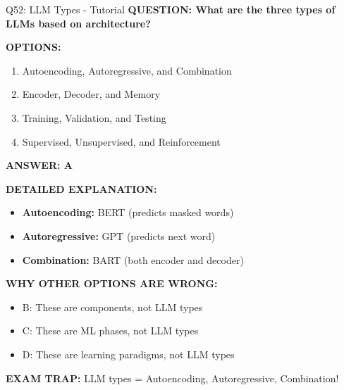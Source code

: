 \documentclass[8pt]{beamer}
\begin{document}
	\begin{frame}{Q52: LLM Types - Tutorial}
		\fontsize{6.5}{7.5}\selectfont
		\textbf{QUESTION: What are the three types of LLMs based on architecture?}
		
		\vspace{0.1cm}
		\textbf{OPTIONS:}
		\begin{enumerate}
			\item Autoencoding, Autoregressive, and Combination
			\item Encoder, Decoder, and Memory
			\item Training, Validation, and Testing
			\item Supervised, Unsupervised, and Reinforcement
		\end{enumerate}
		
		\vspace{0.1cm}
		\textcolor{myblue}{\textbf{ANSWER: A}}
		
		\vspace{0.1cm}
		\textbf{DETAILED EXPLANATION:}
		\begin{itemize}
			\item \textbf{Autoencoding:} BERT (predicts masked words)
			\item \textbf{Autoregressive:} GPT (predicts next word)
			\item \textbf{Combination:} BART (both encoder and decoder)
		\end{itemize}
		
		\vspace{0.1cm}
		\textcolor{myred}{\textbf{WHY OTHER OPTIONS ARE WRONG:}}
		\begin{itemize}
			\item \textcolor{myred}{B:} These are components, not LLM types
			\item \textcolor{myred}{C:} These are ML phases, not LLM types
			\item \textcolor{myred}{D:} These are learning paradigms, not LLM types
		\end{itemize}
		
		\textcolor{myred}{\textbf{EXAM TRAP:}} LLM types = \textcolor{myblue}{Autoencoding, Autoregressive, Combination}!
	\end{frame}
	
\end{document}
